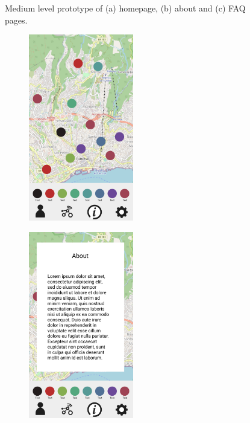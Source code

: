 \begin{figure}
\begin{subfigure}{0.33\textwidth}
        \caption{}
        \label{fig:mediumfaq}
    \end{subfigure}%
    \caption{Medium level prototype of (a) homepage, (b) about and (c) FAQ pages.}
    \label{fig:mediumlevelprototype}
\end{figure}

\begin{figure}
    \centering
    \begin{subfigure}{0.33\textwidth}
        \centering
        \includegraphics[width=130pt]{../assets/images/low_homepage.png}
        \caption{}
        \label{fig:highhome}
    \end{subfigure}%
    \begin{subfigure}{0.33\textwidth}
        \centering
        \includegraphics[width=130pt]{../assets/images/low_about.png}
        \caption{}
        \label{fig:highabout}
    \end{subfigure}%
    \begin{subfigure}{0.33\textwidth}
        \centering

\end{subfigure}
\end{figure}
